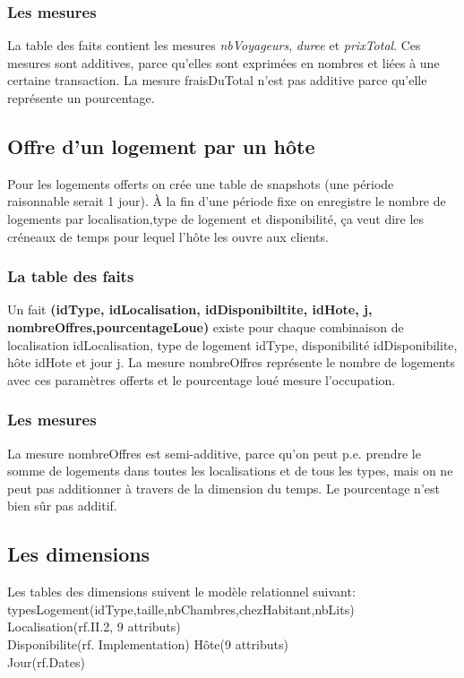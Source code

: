 \documentclass[11pt]{article}
\begin{document}
\subsubsection*{Les mesures}
La table des faits contient les mesures \textit{nbVoyageurs}, \textit{duree} et \textit{prixTotal}. Ces mesures sont additives, parce qu'elles sont exprimées en nombres et liées à une certaine transaction. La mesure fraisDuTotal n'est pas additive parce qu'elle représente un pourcentage.
\subsection{Offre d'un logement par un hôte}
Pour les logements offerts on crée une table de snapshots (une période raisonnable serait 1 jour). À la fin d'une période fixe on enregistre le nombre de logements par localisation,type de logement et disponibilité, ça veut dire les créneaux de temps pour lequel l'hôte les ouvre aux clients.
\subsubsection*{La table des faits}
Un fait \textbf{(idType, idLocalisation, idDisponibiltite, idHote, j, nombreOffres,pourcentageLoue)} existe pour chaque combinaison de localisation idLocalisation, type de logement idType, disponibilité idDisponibilite, hôte idHote et jour j. La mesure nombreOffres représente le nombre de logements avec ces paramètres offerts et le pourcentage loué mesure l'occupation.
\subsubsection*{Les mesures}
La mesure nombreOffres est semi-additive, parce qu'on peut p.e. prendre le somme de logements dans toutes les localisations et de tous les types, mais on ne peut pas additionner à travers de la dimension du temps. Le pourcentage n'est bien sûr pas additif.
\subsection{Les dimensions}
Les tables des dimensions suivent le modèle relationnel suivant:\\
typesLogement(idType,taille,nbChambres,chezHabitant,nbLits)\\
Localisation(rf.II.2, 9 attributs)\\
Disponibilite(rf. Implementation)
Hôte(9 attributs)\\
Jour(rf.Dates)
\end{document}
